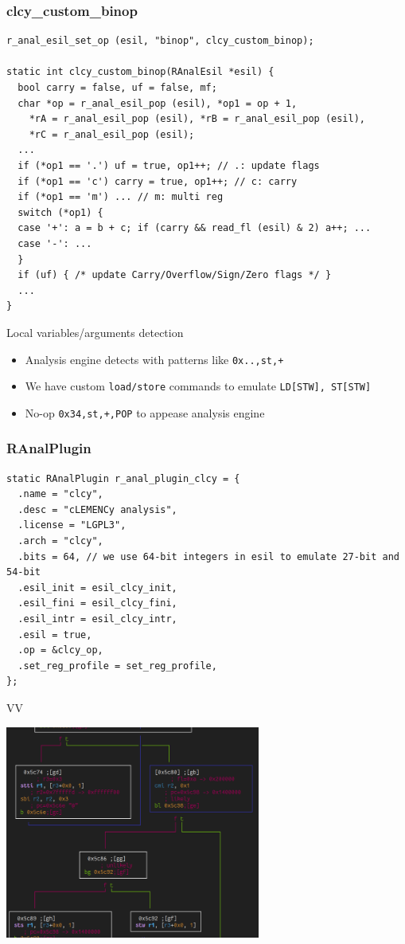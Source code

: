 \documentclass{beamer}
\begin{document}
\begin{frame}[fragile]
  \frametitle{clcy\_custom\_binop}
  \scriptsize
  \begin{verbatim}
r_anal_esil_set_op (esil, "binop", clcy_custom_binop);

static int clcy_custom_binop(RAnalEsil *esil) {
  bool carry = false, uf = false, mf;
  char *op = r_anal_esil_pop (esil), *op1 = op + 1,
    *rA = r_anal_esil_pop (esil), *rB = r_anal_esil_pop (esil),
    *rC = r_anal_esil_pop (esil);
  ...
  if (*op1 == '.') uf = true, op1++; // .: update flags
  if (*op1 == 'c') carry = true, op1++; // c: carry
  if (*op1 == 'm') ... // m: multi reg
  switch (*op1) {
  case '+': a = b + c; if (carry && read_fl (esil) & 2) a++; ...
  case '-': ...
  }
  if (uf) { /* update Carry/Overflow/Sign/Zero flags */ }
  ...
}
  \end{verbatim}
\end{frame}

\begin{frame}{Local variables/arguments detection}
  \begin{itemize}
    \item Analysis engine detects with patterns like \texttt{0x..,st,+}
    \item We have custom \texttt{load/store} commands to emulate
      \texttt{LD[STW], ST[STW]}
    \item No-op \texttt{0x34,st,+,POP} to appease analysis engine
  \end{itemize}
\end{frame}

\begin{frame}[fragile]
  \frametitle{RAnalPlugin}
  \scriptsize
  \begin{verbatim}
static RAnalPlugin r_anal_plugin_clcy = {
  .name = "clcy",
  .desc = "cLEMENCy analysis",
  .license = "LGPL3",
  .arch = "clcy",
  .bits = 64, // we use 64-bit integers in esil to emulate 27-bit and 54-bit
  .esil_init = esil_clcy_init,
  .esil_fini = esil_clcy_fini,
  .esil_intr = esil_clcy_intr,
  .esil = true,
  .op = &clcy_op,
  .set_reg_profile = set_reg_profile,
};
  \end{verbatim}
\end{frame}

\begin{frame}{VV}
  \begin{center}
    \includegraphics[height=7cm]{graph.png}
  \end{center}
\end{frame}
\end{document}
